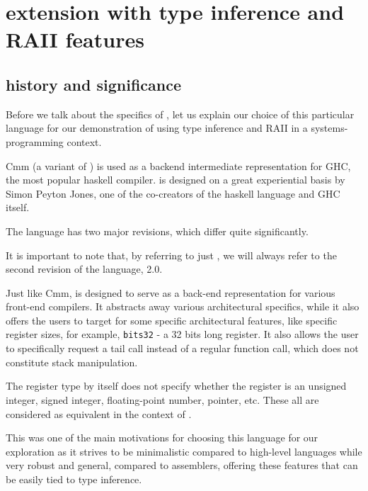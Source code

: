 \chapter{\cmm{} extension with type inference and RAII features}

\label{chap2}



\section{\cmm{} history and significance}

Before we talk about the specifics of \cmm{}, let us explain our choice of this particular language for our demonstration of using type inference and RAII in a systems-programming context.

Cmm (a variant of \cmm{}) is used as a backend intermediate representation for GHC, the most popular haskell compiler. \cmm{} is designed on a great experiential basis by Simon Peyton Jones, one of the co-creators of the haskell language and GHC itself.

\begin{remark}
    The \cmm{} language has two major revisions, which differ quite significantly.

    It is important to note that, by referring to just \cmm{}, we will always refer to the second revision of the language, \cmm{} 2.0.
\end{remark}

Just like Cmm, \cmm{} is designed to serve as a back-end representation for various front-end compilers. It abstracts away various architectural specifics, while it also offers the users to target for some specific architectural features, like specific register sizes, for example, \lstinline{bits32} - a 32 bits long register. It also allows the user to specifically request a tail call instead of a regular function call, which does not constitute stack manipulation.

The register type by itself does not specify whether the register is an unsigned integer, signed integer, floating-point number, pointer, etc. These all are considered as equivalent in the context of \cmm{}.

This was one of the main motivations for choosing this language for our exploration as it strives to be minimalistic compared to high-level languages while very robust and general, compared to assemblers, offering these features that can be easily tied to type inference.

